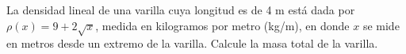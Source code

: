 \item La densidad lineal de una varilla cuya longitud es de 4 m está dada por $\rho(x) = 9 + 2\sqrt{x}$, medida en kilogramos por metro (kg/m), en donde $x$ se mide en metros desde un extremo de la varilla. Calcule la masa total de la varilla.
